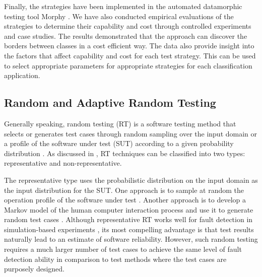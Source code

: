 \documentclass[preprint,1p,authoryear,times]{elsarticle}
\begin{document}
Finally, the strategies have been implemented in the automated datamorphic testing tool Morphy \citep{AITest2020, AITest2020TR}. We have also conducted empirical evaluations of the strategies to determine their capability and cost through controlled experiments and case studies. The results demonstrated that the approach can discover the borders between classes in a cost efficient way. The data also provide insight into the factors that affect capability and cost for each test strategy. This can be used to select appropriate parameters for appropriate strategies for each classification application. 

\subsection{Random and Adaptive Random Testing}

Generally speaking, random testing (RT) is a software testing method that selects or generates test cases through random sampling over the input domain or a profile of the software under test (SUT) according to a given probability distribution \citep{Hamlet1994}. As discussed in \citep{ZhuHallMay1997}, RT techniques can be classified into two types: representative and non-representative. 

The representative type uses the probabilistic distribution on the input domain as the input distribution for the SUT. One approach is to sample at random the operation profile of the software under test \citep{Myers2011}. Another approach is to develop a Markov model of the human computer interaction process and use it to generate random test cases \citep{Whittaker1994}. Although representative RT works well for fault detection in simulation-based experiments \citep{DuranAndNtafos1984, HamletAndTaylor1990, Tsoukalas_et_al1993, Ntafos1998}, its most compelling advantage is that test results naturally lead to an estimate of software reliability. However, such random testing requires a much larger number of test cases to achieve the same level of fault detection ability in comparison to test methods where the test cases are purposely designed. 
\end{document}
